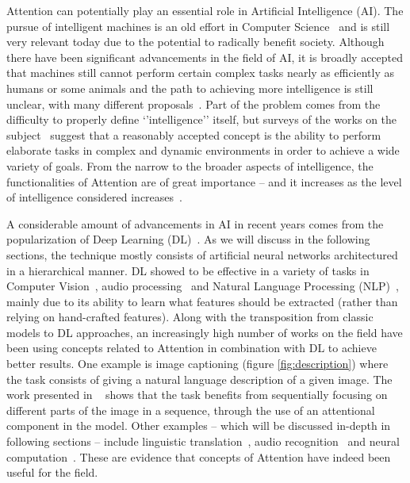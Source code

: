 \documentclass[12pt]{article}
\begin{document}
Attention can potentially play an essential role in Artificial Intelligence (AI).
The pursue of intelligent machines is an old effort in Computer Science~\cite{ref:turing} and is still very
relevant today due to the potential to radically benefit society.
Although there have been significant advancements in the field of AI, it is broadly accepted that
machines still cannot perform certain complex tasks nearly as efficiently as humans or some animals and
the path to achieving more intelligence is still unclear, with many different proposals~\cite{ref:mikolov}.
Part of the problem comes from the difficulty to properly define `'intelligence'' itself, but
surveys of the works on the subject~\cite{ref:aidef} suggest that a reasonably accepted
concept is the ability to perform elaborate tasks in complex and dynamic environments
in order to achieve a wide variety of goals.
From the narrow to the broader aspects of intelligence, the functionalities of Attention
are of great importance -- and it increases
as the level of intelligence considered increases~\cite{ref:helgason}.

A considerable amount of advancements in AI in recent years comes from
the popularization of Deep Learning (DL)~\cite{ref:dl}.
As we will discuss in the following sections, the technique mostly consists of
artificial neural networks architectured in a hierarchical manner.
DL showed to be effective in a variety of tasks in Computer Vision~\cite{ref:imagenet}\cite{ref:segmentation},
audio processing~\cite{ref:wavenet} and Natural Language
Processing (NLP)~\cite{ref:att-all-you-need}, mainly due to its ability
to learn what features should be extracted (rather than relying on hand-crafted features).
Along with the transposition from classic models to DL
approaches, an increasingly high number of works on the field
have been using concepts related to Attention in combination with DL to achieve better results.
One example is image captioning (figure \ref{fig:description}) where the task
consists of giving a natural language description of a given image.
The work presented in ~\cite{ref:img-captioning} shows that the task benefits from
sequentially focusing on different parts of the image in a sequence,
through the use of an attentional component in the model.
Other examples -- which will be discussed in-depth in following sections -- include linguistic
translation~\cite{ref:translation}, audio recognition~\cite{ref:audio} and neural computation~\cite{ref:ntm}.
These are evidence that concepts of Attention have indeed been useful for the field.
\end{document}
